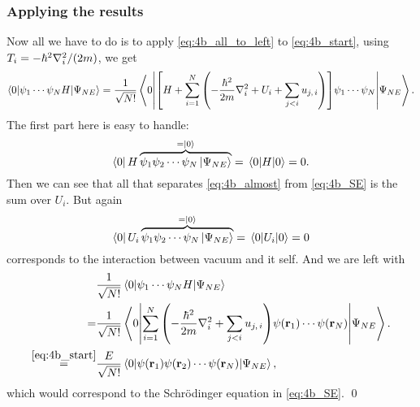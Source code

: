 \documentclass[11pt,letter, swedish, english
]{article}
\begin{document}
\subsubsection{Applying the results}
Now all we have to do is to apply \eqref{eq:4b_all_to_left} to
\eqref{eq:4b_start}, using $T_i=-\hbar^2\laplacian_i/(2m)$, we get
\begin{equation}\label{eq:4b_almost}
\mel**{0}{\psi_1\cdots\psi_{N}H}{\Psi_{NE}}=
\frac{1}{\sqrt{N!}}\mel**{0}{
\qty[H+\sum_{i=1}^N\qty(-\frac{\hbar^2}{2m}\laplacian_i
+U_i+\sum_{j<i}u_{j,\,i})
]\psi_1\cdots\psi_{N}}{\Psi_{NE}}.
\end{equation}
The first part here is easy to handle:
\begin{equation}
\bra{0} H
\overbrace{\psi_1\psi_2\cdots\psi_{N}\ket{\Psi_{NE}}}^{=\ket{0}}
=\mel{0}{H}{0}=0.
\end{equation}
Then we can see that all that separates \eqref{eq:4b_almost} from
\eqref{eq:4b_SE} is the sum over $U_i$. But again
\begin{equation}
\bra{0} U_i
\overbrace{\psi_1\psi_2\cdots\psi_{N}\ket{\Psi_{NE}}}^{=\ket{0}}
=\mel{0}{U_i}{0}=0
\end{equation}
corresponds to the interaction between vacuum and it self. 
And we are left with
\begin{equation}%
\begin{aligned}
&\frac{1}{\sqrt{N!}}\mel**{0}{\psi_1\cdots\psi_{N}H}{\Psi_{NE}}\\
=&\frac{1}{\sqrt{N!}}\mel**{0}{
\sum_{i=1}^N\qty(-\frac{\hbar^2}{2m}\laplacian_i
+\sum_{j<i}u_{j,\,i})
\psi(\vb{r}_1)\cdots\psi(\vb{r}_{N})}{\Psi_{NE}}.\\
\stackrel{\eqref{eq:4b_start}}{=}&
\frac{E}{\sqrt{N!}}
\mel{0}{\psi(\vb{r}_1)\psi(\vb{r}_2)\cdots\psi(\vb{r}_N)}{\Psi_{NE}},
\end{aligned}
\end{equation}
which would correspond to the Schrödinger equation in
\eqref{eq:4b_SE}.
\qed
\end{document}
